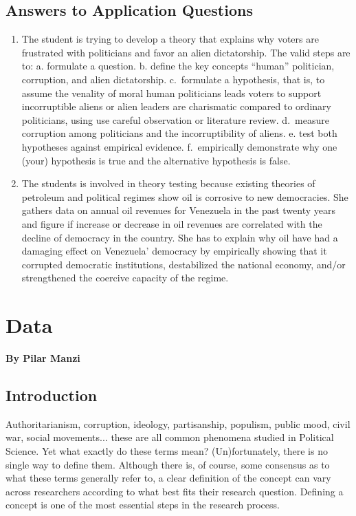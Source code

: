 \documentclass{book}
\begin{document}
\hypertarget{answers-to-application-questions-1}{%
\section{Answers to Application
Questions}\label{answers-to-application-questions-1}}

\begin{enumerate}
\def\labelenumi{\arabic{enumi}.}
\item
  The student is trying to develop a theory that explains why voters are
  frustrated with politicians and favor an alien dictatorship. The valid steps
  are to: a. formulate a question. b. define the key concepts ``human''
  politician, corruption, and alien dictatorship. c.~formulate a hypothesis,
  that is, to assume the venality of moral human politicians leads voters to
  support incorruptible aliens or alien leaders are charismatic compared to
  ordinary politicians, using use careful observation or literature review.
  d.~measure corruption among politicians and the incorruptibility of aliens.
  e. test both hypotheses against empirical evidence. f.~empirically
  demonstrate why one (your) hypothesis is true and the alternative hypothesis
  is false.
\item
  The students is involved in theory testing because existing theories of
  petroleum and political regimes show oil is corrosive to new democracies.
  She gathers data on annual oil revenues for Venezuela in the past twenty
  years and figure if increase or decrease in oil revenues are correlated with
  the decline of democracy in the country. She has to explain why oil have had
  a damaging effect on Venezuela' democracy by empirically showing that it
  corrupted democratic institutions, destabilized the national economy, and/or
  strengthened the coercive capacity of the regime.
\end{enumerate}

\hypertarget{data}{%
\chapter{Data}\label{data}}

\textbf{By Pilar Manzi}

\hypertarget{introduction-3}{%
\section{Introduction}\label{introduction-3}}

Authoritarianism, corruption, ideology, partisanship, populism, public mood,
civil war, social movements... these are all common phenomena studied in
Political Science. Yet what exactly do these terms mean? (Un)fortunately,
there is no single way to define them. Although there is, of course, some
consensus as to what these terms generally refer to, a clear definition of the
concept can vary across researchers according to what best fits their research
question. Defining a concept is one of the most essential steps in the
research process.
\end{document}
